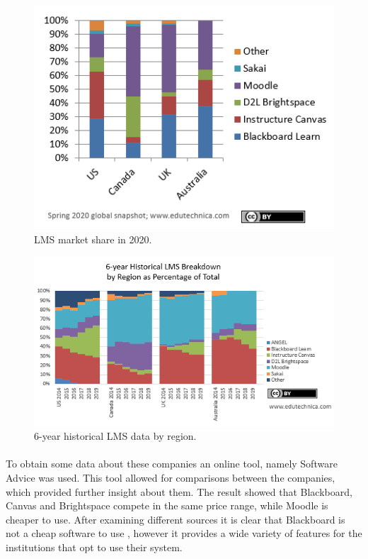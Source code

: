 \documentclass[]{article}
\begin{document}
\begin{figure}
    \centering
    \includegraphics[width =\linewidth]{lms-vle-2020.png}
    \caption{LMS market share in 2020. \cite{VLE-2020-IMG}}
    \label{fig:LMS-2020}
\end{figure}

\begin{figure}
    \centering
    \includegraphics[width =1.2\linewidth]{lms-vle-2020-y5.png}
    \caption{6-year historical LMS data by region. \cite{VLE-2020-IMG}}
    \label{fig:LMS-2020-6-year}
\end{figure}

\paragraph{}
To obtain some data about these companies an online tool, namely Software Advice \cite{Software-Advice} was used. This tool allowed for comparisons between the companies, which provided further insight about them. The result showed that Blackboard, Canvas and Brightspace compete in the same price range, while Moodle is cheaper to use. After examining different sources it is clear that Blackboard is not a cheap software to use \cite{Blackboard-v-Moodle}, however it provides a wide variety of features for the institutions that opt to use their system.
\end{document}
